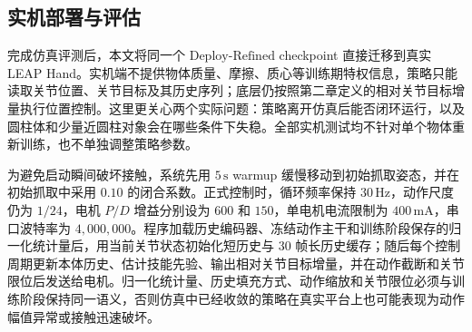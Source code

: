 \begin{table}[htbp]
    \centering
    \ablationcompacttable
    \caption{动作一致性损失权重消融结果}
    \label{tab:appendix_action_loss_weight_sensitivity}
\end{table}

\subsection{实机部署与评估}
\thesisbodyfont
完成仿真评测后，本文将同一个 \(\mathrm{Deploy\text{-}Refined}\) checkpoint 直接迁移到真实 LEAP Hand。实机端不提供物体质量、摩擦、质心等训练期特权信息，策略只能读取关节位置、关节目标及其历史序列；底层仍按照第二章定义的相对关节目标增量执行位置控制。这里更关心两个实际问题：策略离开仿真后能否闭环运行，以及圆柱体和少量近圆柱对象会在哪些条件下失稳。全部实机测试均不针对单个物体重新训练，也不单独调整策略参数。

为避免启动瞬间破坏接触，系统先用 \(5\,\mathrm{s}\) warmup 缓慢移动到初始抓取姿态，并在初始抓取中采用 \(0.10\) 的闭合系数。正式控制时，循环频率保持 \(30\,\mathrm{Hz}\)，动作尺度仍为 \(1/24\)，电机 \(P/D\) 增益分别设为 \(600\) 和 \(150\)，单电机电流限制为 \(400\,\mathrm{mA}\)，串口波特率为 \(4{,}000{,}000\)。程序加载历史编码器、冻结动作主干和训练阶段保存的归一化统计量后，用当前关节状态初始化短历史与 \(30\) 帧长历史缓存；随后每个控制周期更新本体历史、估计技能先验、输出相对关节目标增量，并在动作截断和关节限位后发送给电机。归一化统计量、历史填充方式、动作缩放和关节限位必须与训练阶段保持同一语义，否则仿真中已经收敛的策略在真实平台上也可能表现为动作幅值异常或接触迅速破坏。

